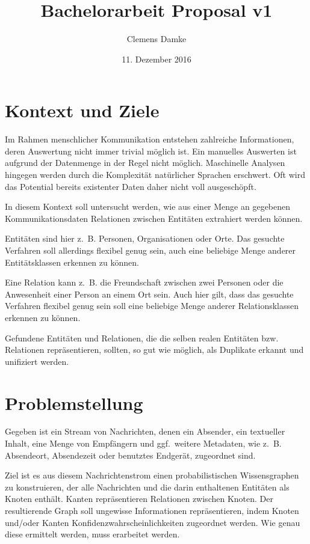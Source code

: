 \documentclass[12pt,a4paper,bibliography=totocnumbered,listof=totocnumbered]{scrartcl}
\title{Bachelorarbeit Proposal v1}
\author{Clemens Damke}
\date{11. Dezember 2016}
\begin{document}
{ \maketitle}

\section{Kontext und Ziele}

Im Rahmen menschlicher Kommunikation entstehen zahlreiche Informationen, deren Auswertung nicht immer trivial möglich ist. Ein manuelles Auswerten ist aufgrund der Datenmenge in der Regel nicht möglich. Maschinelle Analysen hingegen werden durch die Komplexität natürlicher Sprachen erschwert. Oft wird das Potential bereits existenter Daten daher nicht voll ausgeschöpft.

In diesem Kontext soll untersucht werden, wie aus einer Menge an gegebenen Kommunikationsdaten Relationen zwischen Entitäten extrahiert werden können.

Entitäten sind hier z.~B. Personen, Organisationen oder Orte. Das gesuchte Verfahren soll allerdings flexibel genug sein, auch eine beliebige Menge anderer Entitätsklassen erkennen zu können.

Eine Relation kann z.~B. die Freundschaft zwischen zwei Personen oder die Anwesenheit einer Person an einem Ort sein. Auch hier gilt, dass das gesuchte Verfahren flexibel genug sein soll eine beliebige Menge anderer Relationsklassen erkennen zu können.

Gefundene Entitäten und Relationen, die die selben realen Entitäten bzw. Relationen repräsentieren, sollten, so gut wie möglich, als Duplikate erkannt und unifiziert werden.


\section{Problemstellung}

Gegeben ist ein Stream von Nachrichten, denen ein Absender, ein textueller Inhalt, eine Menge von Empfängern und ggf.\ weitere Metadaten, wie z.~B. Absendeort, Absendezeit oder benutztes Endgerät, zugeordnet sind.

Ziel ist es aus diesem Nachrichtenstrom einen probabilistischen Wissensgraphen zu konstruieren, der alle Nachrichten und die darin enthaltenen Entitäten als Knoten enthält. Kanten repräsentieren Relationen zwischen Knoten. Der resultierende Graph soll ungewisse Informationen repräsentieren, indem Knoten und/oder Kanten Konfidenzwahrscheinlichkeiten zugeordnet werden. Wie genau diese ermittelt werden, muss erarbeitet werden.
\end{document}
